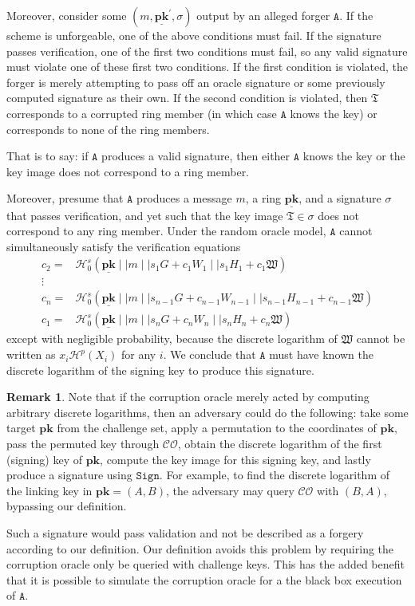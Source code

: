 \documentclass{mrl}
\theoremstyle{plain}
\theoremstyle{definition}
\newtheorem{remark}{Remark}[section]
\begin{document}
Moreover, consider some $(m, \underline{\textbf{pk}}^\prime, \sigma)$ output by an alleged forger $\texttt{A}$. If the scheme is unforgeable, one of the above conditions must fail. If the signature passes verification, one of the first two conditions must fail, so any valid signature must violate one of these first two conditions. If the first condition is violated, the forger is merely attempting to pass off an oracle signature or some previously computed signature as their own. If the second condition is violated, then $\mathfrak{T}$ corresponds to a corrupted ring member (in which case $\texttt{A}$ knows the key) or corresponds to none of the ring members. 

That is to say: if $\texttt{A}$ produces a valid signature, then either $\texttt{A}$ knows the key or the key image does not correspond to a ring member. 

Moreover, presume that $\texttt{A}$ produces a message $m$, a ring $\underline{\textbf{pk}}$, and a signature $\sigma$ that passes verification, and yet such that the key image $\mathfrak{T} \in \sigma$ does not correspond to any ring member. Under the random oracle model, $\texttt{A}$ cannot simultaneously satisfy the verification equations
\begin{align*}
c_{2} =& \mathcal{H}^s_0(\underline{\textbf{pk}} \mid \mid m \mid \mid s_1 G + c_1 W_1 \mid \mid s_1 H_1 + c_1 \mathfrak{W}) \\
\vdots & \\
c_{n} =& \mathcal{H}^s_0(\underline{\textbf{pk}} \mid \mid m \mid \mid s_{n-1} G + c_{n-1} W_{n-1} \mid \mid s_{n-1} H_{n-1} + c_{n-1} \mathfrak{W}) \\
c_{1} =& \mathcal{H}^s_0(\underline{\textbf{pk}} \mid \mid m \mid \mid s_{n} G + c_{n} W_{n} \mid \mid s_{n} H_{n} + c_{n} \mathfrak{W}) 
\end{align*}
except with negligible probability, because the discrete logarithm of $\mathfrak{W}$ cannot be written as $x_i \mathcal{H}^p(X_i)$ for any $i$. We conclude that $\texttt{A}$ must have known the discrete logarithm of the signing key to produce this signature.

\begin{remark}
Note that if the corruption oracle merely acted by computing arbitrary discrete logarithms, then an adversary could do the following: take some target $\textbf{pk}$ from the challenge set, apply a permutation to the coordinates of $\textbf{pk}$, pass the permuted key through $\mathcal{CO}$, obtain the discrete logarithm of the first (signing) key of $\textbf{pk}$, compute the key image for this signing key, and lastly produce a signature using $\texttt{Sign}$. For example, to find the discrete logarithm of the linking key in $\textbf{pk} = (A, B)$, the adversary may query $\mathcal{CO}$ with $(B, A)$, bypassing our definition.

Such a signature would pass validation and not be described as a forgery according to our definition. Our definition avoids this problem by requiring the corruption oracle only be queried with challenge keys. This has the added benefit that it is possible to simulate the corruption oracle for a the black box execution of $\texttt{A}$.
\end{remark}
\end{document}
